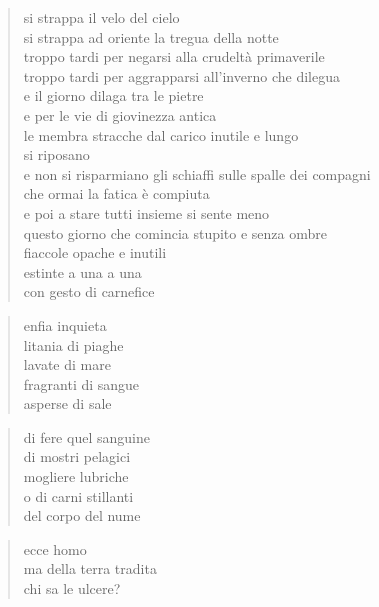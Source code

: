 \clearpage


\begin{verse}
    si strappa il velo del cielo\\
    si strappa ad oriente la tregua della notte\\
    troppo tardi per negarsi alla crudeltà primaverile\\
    troppo tardi per aggrapparsi all'inverno che dilegua\\
    e il giorno dilaga tra le pietre\\
    e per le vie di giovinezza antica\\
    le membra stracche dal carico inutile e lungo\\
    si riposano\\
    e non si risparmiano gli schiaffi sulle spalle dei compagni\\
    che ormai la fatica è compiuta\\
    e poi a stare tutti insieme si sente meno\\
    questo giorno che comincia stupito e senza ombre\\
    fiaccole opache e inutili\\
    estinte a una a una\\
    con gesto di carnefice
\end{verse}

\clearpage


\begin{verse}
    enfia inquieta\\
    litania di piaghe\\
    lavate di mare\\
    fragranti di sangue\\
    asperse di sale
\end{verse}

\begin{verse}
    di fere quel sanguine\\
    di mostri pelagici\\
    mogliere lubriche\\
    o di carni stillanti\\
    del corpo del nume
\end{verse}

\begin{verse}
    ecce homo\\
    ma della terra tradita\\
    chi sa le ulcere?
\end{verse}

